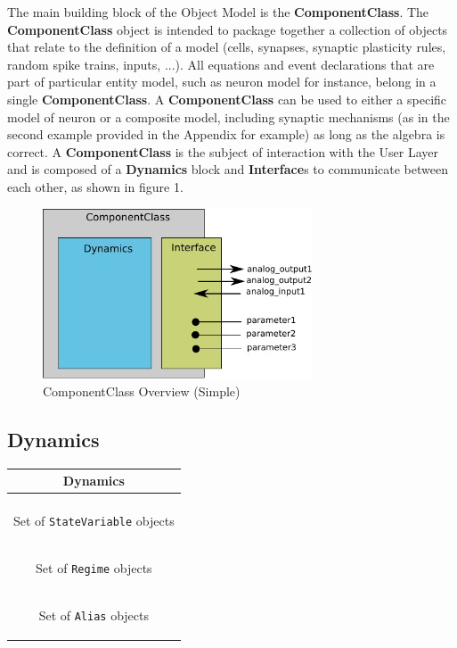 \documentclass{article}
\newcommand{\ComponentClass}{{\bf{ComponentClass}}\xspace}
\newcommand{\Dynamics}{{\bf{Dynamics}}\xspace}
\newcommand{\Interfaces}{{\bf{Interface}}s\xspace}
\begin{document}
The main building block of the Object Model is the \ComponentClass.
The \ComponentClass object is intended to package together a collection of objects that relate to the definition of a model (cells, synapses, synaptic plasticity rules, random spike trains, inputs, ...). 
All equations and event declarations that are part of particular entity model, such as neuron model for instance, belong in a single \ComponentClass.
A \ComponentClass can be used to either a specific model of neuron or a composite model, including synaptic mechanisms (as in the second example provided in the Appendix for example) as long as the algebra is correct.
A \ComponentClass is the subject of interaction with the User Layer and is composed of a \Dynamics block and \Interfaces to communicate between each other, as shown in figure 1.

\begin{figure}[htb!]
\center
\includegraphics[width=8cm]{figures/component_simple.pdf}
\protect\caption{ComponentClass Overview (Simple)}
\label{fig:EX1_RegimeGraph}
\end{figure}

\subsection{Dynamics}


\begin{table}[htb]
\center
\begin{tabular}{|c|}
\hline
\hline
Dynamics \\
\hline \\
\colorbox{issuecolor}{\parbox{0.4\linewidth}
{\center Set of {\tt StateVariable} objects}} \\
\hline
\colorbox{issuecolor}{\parbox{0.4\linewidth}
{\center Set of {\tt Regime} objects}} \\
\hline
\colorbox{issuecolor}{\parbox{0.4\linewidth}
{\center Set of {\tt Alias} objects}} \\
\hline
\end{tabular}
\end{table}
\end{document}
